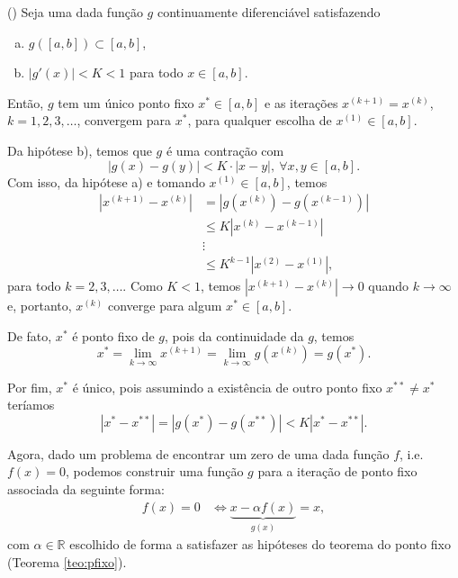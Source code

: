 \begin{teo}()\label{teo:pfixo}
  Seja uma dada função $g$ continuamente diferenciável satisfazendo
  \begin{enumerate}[a)]
  \item $g([a, b]) \subset [a, b]$,
  \item $|g'(x)|<K<1$ para todo $x\in [a, b]$.
  \end{enumerate}
Então, $g$ tem um único ponto fixo $x^*\in [a, b]$ e as iterações $x^{(k+1)}=x^{(k)}$, $k=1, 2, 3, \ldots$, convergem para $x^*$, para qualquer escolha de $x^{(1)}\in [a, b]$.
\end{teo}
\begin{dem}
  Da hipótese b), temos que $g$ é uma contração com
  \begin{equation}
    |g(x) - g(y)| < K\cdot |x - y|,~\forall x,y\in [a, b].
  \end{equation}
Com isso, da hipótese a) e tomando $x^{(1)}\in [a, b]$, temos
\begin{align}
  |x^{(k+1)} - x^{(k)}| &= |g(x^{(k)}) - g(x^{(k-1)})|\\
  &\leq K |x^{(k)} - x^{(k-1)}|\\
  &\vdots \\
  &\leq K^{k-1}|x^{(2)}-x^{(1)}|,
\end{align}
para todo $k=2, 3, \ldots$. Como $K<1$, temos $|x^{(k+1)}-x^{(k)}|\to 0$ quando $k\to\infty$ e, portanto, $x^{(k)}$ converge para algum $x^*\in [a, b]$.

De fato, $x^*$ é ponto fixo de $g$, pois da continuidade da $g$, temos
\begin{equation}
  x^* = \lim_{k\to\infty} x^{(k+1)} = \lim_{k\to\infty} g(x^{(k)}) = g(x^*).
\end{equation}

Por fim, $x^*$ é único, pois assumindo a existência de outro ponto fixo $x^{**}\neq x^*$ teríamos
\begin{equation}
  |x^* - x^{**}| = |g(x^*) - g(x^{**})| < K|x^* - x^{**}|.
\end{equation}
\end{dem}

Agora, dado um problema de encontrar um zero de uma dada função $f$, i.e. $f(x)=0$, podemos construir uma função $g$ para a iteração de ponto fixo associada da seguinte forma:
\begin{align}
  f(x) = 0 &\Leftrightarrow \underbrace{x - \alpha f(x)}_{g(x)} = x,
\end{align}
com $\alpha\in\mathbb{R}$ escolhido de forma a satisfazer as hipóteses do teorema do ponto fixo (Teorema \ref{teo:pfixo}).

